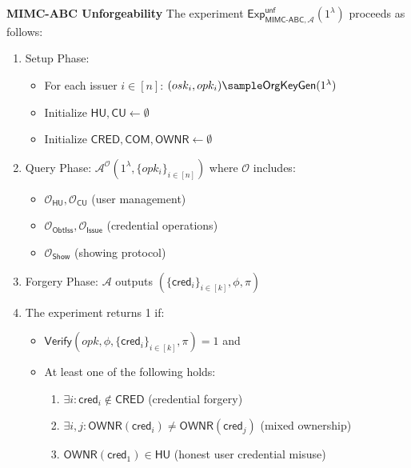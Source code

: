 \noindent \textbf{MIMC-ABC Unforgeability} 
The experiment $\mathsf{Exp}^{\mathsf{unf}}_{\mathsf{MIMC\mbox{-}ABC},\mathcal{A}}(1^\lambda)$ proceeds as follows:

\begin{enumerate}
    \item Setup Phase:
    \begin{itemize}
        \item For each issuer $i \in [n]$: $(osk_i, opk_i) \sample \mathsf{OrgKeyGen}(1^\lambda)$
        \item Initialize $\mathsf{HU, CU} \gets \emptyset$
        \item Initialize $\mathsf{CRED, COM, OWNR} \gets \emptyset$
    \end{itemize}

    \item Query Phase: $\mathcal{A}^{\mathcal{O}}(1^\lambda, \{opk_i\}_{i \in [n]})$ where $\mathcal{O}$ includes:
    \begin{itemize}
        \item $\mathcal{O}_{\mathsf{HU}}, \mathcal{O}_{\mathsf{CU}}$ (user management)
        \item $\mathcal{O}_{\mathsf{ObtIss}}, \mathcal{O}_{\mathsf{Issue}}$ (credential operations)
        \item $\mathcal{O}_{\mathsf{Show}}$ (showing protocol)
    \end{itemize}

    \item Forgery Phase: $\mathcal{A}$ outputs $(\{\mathsf{cred}_i\}_{i \in [k]}, \phi, \pi)$

    \item The experiment returns 1 if:
    \begin{itemize}
        \item $\mathsf{Verify}(opk, \phi, \{\mathsf{cred}_i\}_{i \in [k]}, \pi) = 1$ and
        \item At least one of the following holds:
            \begin{enumerate}
                \item $\exists i: \mathsf{cred}_i \notin \mathsf{CRED}$ (credential forgery)
                \item $\exists i,j: \mathsf{OWNR}(\mathsf{cred}_i) \neq \mathsf{OWNR}(\mathsf{cred}_j)$ (mixed ownership)
                \item $\mathsf{OWNR}(\mathsf{cred}_1) \in \mathsf{HU}$ (honest user credential misuse)
            \end{enumerate}
    \end{itemize}
\end{enumerate}












